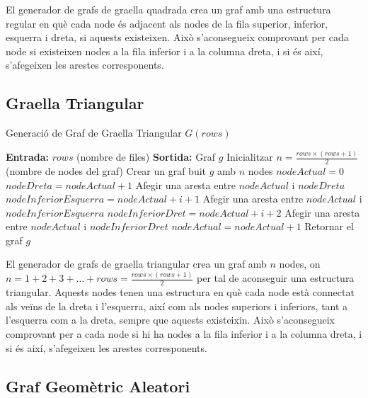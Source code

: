 \documentclass[a4paper]{article}
\begin{document}
	El generador de grafs de graella quadrada crea un graf amb una estructura regular en què cada node és adjacent als nodes de la fila superior, inferior, esquerra i dreta, si aquests existeixen. Això s'aconsegueix comprovant per cada node si existeixen nodes a la fila inferior i a la columna dreta, i si és així, s'afegeixen les arestes corresponents.

	\subsection{Graella Triangular}

	\begin{algorithm} [H]
		\caption{Generació de Graf de Graella Triangular $G(rows)$}
		\begin{algorithmic} [1]
			\Statex \textbf{Entrada:} $rows$ (nombre de files)
			\Statex \textbf{Sortida:} Graf $g$
			\Statex \vspace{-0.25em}
			\State Inicialitzar $n = \frac{rows \times (rows + 1)}{2}$ (nombre de nodes del graf)
			\State Crear un graf buit $g$ amb $n$ nodes
			\State $nodeActual = 0$
						\State $nodeDreta = nodeActual + 1$
						\State Afegir una aresta entre $nodeActual$ i $nodeDreta$
					\EndIf
						\State $nodeInferiorEsquerra = nodeActual + i + 1$
						\State Afegir una aresta entre $nodeActual$ i $nodeInferiorEsquerra$
						\State $nodeInferiorDret = nodeActual + i + 2$
						\State Afegir una aresta entre $nodeActual$ i $nodeInferiorDret$
					\EndIf
					\State $nodeActual = nodeActual + 1$
				\EndFor
			\EndFor
			\State Retornar el graf $g$
		\end{algorithmic}
	\end{algorithm}
	
	El generador de grafs de graella triangular crea un graf amb $n$ nodes, on $n = 1 + 2 + 3 + \ldots + rows = \frac{rows \times (rows + 1)}{2}$ per tal de aconseguir una estructura triangular. Aquests nodes tenen una estructura en què cada node està connectat als veïns de la dreta i l'esquerra, així com als nodes superiors i inferiors, tant a l'esquerra com a la dreta, sempre que aquests existeixin. Això s'aconsegueix comprovant per a cada node si hi ha nodes a la fila inferior i a la columna dreta, i si és així, s'afegeixen les arestes corresponents.

	\subsection{Graf Geomètric Aleatori}
	
\end{document}

